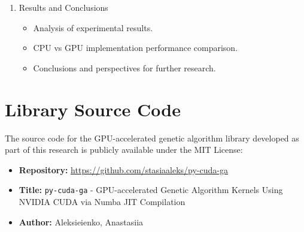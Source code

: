 \begin{enumerate}[label=\arabic*., leftmargin=*, itemsep=0.1cm]
\item {Results and Conclusions}
\begin{itemize}[noitemsep, topsep=0pt]
    \item Analysis of experimental results.
    \item CPU vs GPU implementation performance comparison.
    \item Conclusions and perspectives for further research.
\end{itemize}
\end{enumerate}

\vspace{0.5cm}



\newpage
\section{Library Source Code}
\label{app:library}

The source code for the GPU-accelerated genetic algorithm library developed as part of this research is publicly available under the MIT License:

\begin{itemize}
  \item \textbf{Repository:} \url{https://github.com/stasiaaleks/py-cuda-ga}
  \item \textbf{Title:} \texttt{py-cuda-ga} - GPU-accelerated Genetic Algorithm Kernels Using NVIDIA CUDA via Numba JIT Compilation
  \item \textbf{Author:} Aleksieienko, Anastasiia
\end{itemize}

\newpage
\printbibliography


